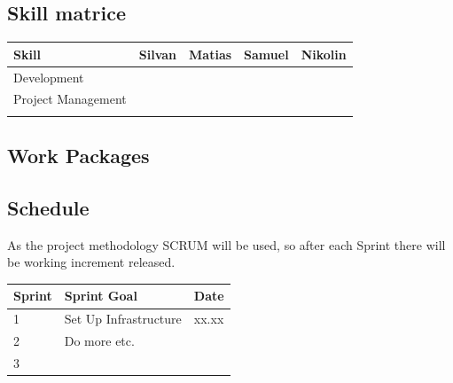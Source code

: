 \documentclass{article}
\begin{document}
\subsection{Skill matrice}
\begin{table}[htb!]
\begin{tabular}{lllll}
 \textbf{Skill}  & \textbf{Silvan} & \textbf{Matias} & \textbf{Samuel} & \textbf{Nikolin} \\
\hline
Development       &                 &                   &                   &                  \\
Project Management &                 &                   &                   &                  \\
                  &                 &                   &                   &                 
\end{tabular}
\end{table}

\subsection{Work Packages}

\subsection{Schedule}
As the project methodology SCRUM will be used, so after each Sprint there will be  working increment released.


\begin{table}[htb!]
\begin{tabular}{lll}
\textbf{Sprint} & \textbf{Sprint Goal} & \textbf{Date} \\
\hline
1      & Set Up Infrastructure & xx.xx \\
2      & Do more etc.          &            \\
3       &                       &           
\end{tabular}
\end{table}
\end{document}
